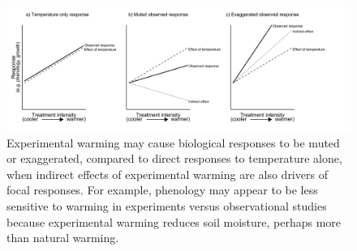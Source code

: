 \documentclass{article}
\begin{document}
 \begin{figure}[p]
     \centering
 \includegraphics{figures/DirIndWarmingEffects.pdf}    
 \caption{Experimental warming may cause biological responses to be muted or exaggerated, compared to direct responses to temperature alone, when indirect effects of experimental warming are also drivers of focal responses. For example, phenology may appear to be less sensitive to warming in experiments versus observational studies \citep{wolkovich2012} because experimental warming reduces soil moisture, perhaps more than natural warming.}
 \end{figure}
\end{document}
